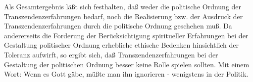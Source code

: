 Als Gesamtergebnis läßt sich festhalten, daß weder die politische
Ordnung der Transzendenzerfahrungen bedarf, noch die Realisierung bzw.
der Ausdruck der Transzendenzerfahrungen durch die politische Ordnung
geschehen muß. Da andererseits die Forderung der Berücksichtigung
spiritueller Erfahrungen bei der Gestaltung politischer Ordnung
erhebliche ethische Bedenken hinsichtlich der Toleranz aufwirft, so
ergibt sich, daß Transzendenzerfahrungen bei der Gestaltung der
politischen Ordnung besser keine Rolle spielen sollten. Mit einem Wort:
Wenn es Gott gäbe, müßte man ihn ignorieren - wenigstens in der Politik.



